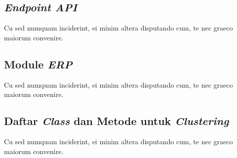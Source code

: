 \subsection{\textit{Endpoint API}}
Cu sed numquam inciderint, ei minim altera disputando cum, te nec graeco maiorum convenire.\\

\subsection{Module \textit{ERP}}
Cu sed numquam inciderint, ei minim altera disputando cum, te nec graeco maiorum convenire.\\

\subsection{Daftar \textit{Class} dan Metode untuk \textit{Clustering} }
Cu sed numquam inciderint, ei minim altera disputando cum, te nec graeco maiorum convenire.\\

